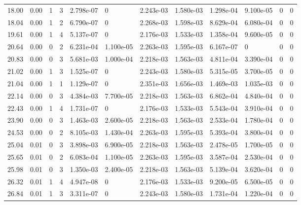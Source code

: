 \documentclass[preview]{standalone}
\begin{document}
{{\begin{tabular}{L{1.2cm}C{1.2cm} C{0.3cm}C{0.5cm} C{1.4cm}C{1.4cm} C{1.4cm}C{1.4cm} C{1.6cm}C{1.6cm} C{1.6cm}C{1.6cm}}
  18.00  &  0.00  & 1     &  3 &  2.798e-07  & 0  &  2.243e-03&   1.580e-03& 1.298e-04 & 9.100e-05   &  0 & 0  \\ 
  18.04  &  0.00  & 1     &  2 &  6.790e-07  & 0  &  2.268e-03&   1.598e-03& 8.629e-04 & 6.080e-04   &  0 & 0  \\ 
  19.61  &  0.00  & 1     &  4 &  5.137e-07  & 0  &  2.176e-03&   1.533e-03& 1.358e-04 & 9.600e-05   &  0 & 0  \\ 
  20.64  &  0.00  & 0     &  2 &  6.231e-04  & 1.100e-05  &  2.263e-03&   1.595e-03& 6.167e-07 & 0   &  0 & 0  \\ 
  20.83  &  0.00  & 0     &  3 &  5.681e-03  & 1.000e-04  &  2.218e-03&   1.563e-03& 4.811e-04 & 3.390e-04   &  0 & 0  \\ 
  21.02  &  0.00  & 1     &  3 &  1.525e-07  & 0  &  2.243e-03&   1.580e-03& 5.315e-05 & 3.700e-05   &  0 & 0  \\ 
  21.04  &  0.00  & 1     &  1 &  1.129e-07  & 0  &  2.351e-03&   1.656e-03& 1.469e-03 & 1.035e-03   &  0 & 0  \\ 
  22.14  &  0.00  & 0     &  3 &  4.384e-03  & 7.700e-05  &  2.218e-03&   1.563e-03& 6.862e-04 & 4.840e-04   &  0 & 0  \\ 
  22.43  &  0.00  & 1     &  4 &  1.731e-07  & 0  &  2.176e-03&   1.533e-03& 5.543e-04 & 3.910e-04   &  0 & 0  \\ 
  23.90  &  0.00  & 0     &  3 &  1.463e-03  & 2.600e-05  &  2.218e-03&   1.563e-03& 2.533e-04 & 1.780e-04   &  0 & 0  \\ 
  24.53  &  0.00  & 0     &  2 &  8.105e-03  & 1.430e-04  &  2.263e-03&   1.595e-03& 5.393e-04 & 3.800e-04   &  0 & 0  \\ 
  25.04  &  0.01  & 0     &  3 &  3.898e-03  & 6.900e-05  &  2.218e-03&   1.563e-03& 2.478e-05 & 1.700e-05   &  0 & 0  \\ 
  25.65  &  0.01  & 0     &  2 &  6.083e-04  & 1.100e-05  &  2.263e-03&   1.595e-03& 3.587e-04 & 2.530e-04   &  0 & 0  \\ 
  25.98  &  0.01  & 0     &  3 &  1.350e-03  & 2.400e-05  &  2.218e-03&   1.563e-03& 5.139e-04 & 3.620e-04   &  0 & 0  \\ 
  26.32  &  0.01  & 1     &  4 &  4.947e-08  & 0  &  2.176e-03&   1.533e-03& 9.200e-05 & 6.500e-05   &  0 & 0  \\ 
  26.84  &  0.01  & 1     &  3 &  3.311e-07  & 0  &  2.243e-03&   1.580e-03& 1.731e-04 & 1.220e-04   &  0 & 0  \\ 
\hline 
\end{tabular} 

}}
\end{document}
